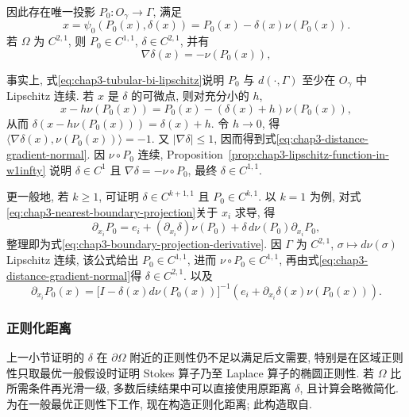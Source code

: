 因此存在唯一投影 $P_0:O_\gamma\to\Gamma$, 满足
\begin{equation}
 x=\psi_0(P_0(x),\delta(x))=P_0(x)-\delta(x)\nu(P_0(x)).
 \label{eq:chap3-nearest-boundary-projection}
\end{equation}
若 $\Omega$ 为 $C^{2,1}$, 则 $P_0\in C^{1,1}$, $\delta\in C^{2,1}$, 并有
\begin{equation}
 \nabla\delta(x)=-\nu(P_0(x)),
 \label{eq:chap3-distance-gradient-normal}
\end{equation}

事实上, 式\eqref{eq:chap3-tubular-bi-lipschitz}说明 $P_0$ 与 $d(\cdot,\Gamma)$ 至少在 $O_\gamma$ 中 Lipschitz 连续. 若 $x$ 是 $\delta$ 的可微点, 则对充分小的 $h$,
\[
 x-h\nu(P_0(x))=P_0(x)-(\delta(x)+h)\nu(P_0(x)),
\]
从而 $\delta(x-h\nu(P_0(x)))=\delta(x)+h$. 令 $h\to0$, 得 $\langle\nabla\delta(x),\nu(P_0(x))\rangle=-1$. 又 $|\nabla\delta|\leq1$, 因而得到式\eqref{eq:chap3-distance-gradient-normal}. 因 $\nu\circ P_0$ 连续, Proposition~\ref{prop:chap3-lipschitz-function-in-w1infty} 说明 $\delta\in C^1$ 且 $\nabla\delta=-\nu\circ P_0$, 最终 $\delta\in C^{1,1}$.

更一般地, 若 $k\geq1$, 可证明 $\delta\in C^{k+1,1}$ 且 $P_0\in C^{k,1}$. 以 $k=1$ 为例, 对式\eqref{eq:chap3-nearest-boundary-projection}关于 $x_i$ 求导, 得
\[
 \partial_{x_i}P_0=e_i+(\partial_{x_i}\delta)\nu(P_0)
 +\delta\,d\nu(P_0)\partial_{x_i}P_0,
\]
整理即为式\eqref{eq:chap3-boundary-projection-derivative}. 因 $\Gamma$ 为 $C^{2,1}$, $\sigma\mapsto d\nu(\sigma)$ Lipschitz 连续, 该公式给出 $P_0\in C^{1,1}$, 进而 $\nu\circ P_0\in C^{1,1}$, 再由式\eqref{eq:chap3-distance-gradient-normal}得 $\delta\in C^{2,1}$.
以及
\begin{equation}
 \partial_{x_i}P_0(x)=
 \bigl[I-\delta(x)d\nu(P_0(x))\bigr]^{-1}
 \left(e_i+\partial_{x_i}\delta(x)\nu(P_0(x))\right).
 \label{eq:chap3-boundary-projection-derivative}
\end{equation}

\subsubsection{正则化距离}
\label{subsec:chap3-regularized-distance}

上一小节证明的 $\delta$ 在 $\partial\Omega$ 附近的正则性仍不足以满足后文需要, 特别是在区域正则性只取最优一般假设时证明 Stokes 算子乃至 Laplace 算子的椭圆正则性. 若 $\Omega$ 比所需条件再光滑一级, 多数后续结果中可以直接使用原距离 $\delta$, 且计算会略微简化. 为在一般最优正则性下工作, 现在构造正则化距离; 此构造取自.

